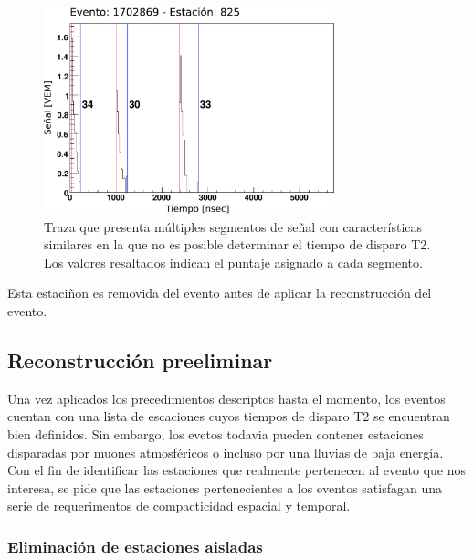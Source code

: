 		\begin{figure}[ht]
			\begin{center}
			\includegraphics[width=0.75\textwidth]{fig/seleccionAuger/multipicos.pdf}
			\caption{Traza que presenta múltiples segmentos de señal con características similares en la que no es posible determinar el tiempo de disparo T2. Los valores resaltados indican el puntaje asignado a cada segmento.}
			\label{fig:multipicos}
			\end{center}
		\end{figure}
		Esta estaciñon es removida del evento antes de aplicar la reconstrucción del evento.
		
	\subsection{Reconstrucción preeliminar}
	
	Una vez aplicados los precedimientos descriptos hasta el momento, los eventos cuentan con una lista de escaciones cuyos tiempos de disparo T2 se encuentran bien definidos.
	Sin embargo, los evetos todavia pueden contener estaciones disparadas por muones atmosféricos o incluso por una lluvias de baja energía.
	Con el fin de identificar las estaciones que realmente pertenecen al evento que nos interesa, se pide que las estaciones pertenecientes a los eventos satisfagan una serie de requerimentos de compacticidad espacial y temporal.
	
	\subsubsection{Eliminación de estaciones aisladas} 
	

